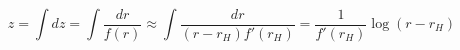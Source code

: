 \begin{equation}
z = \int dz = \int \frac{dr}{f(r)} \approx \int \frac{dr}{(r-r_H) f'(r_H)} = \frac{1}{f'(r_H)} \log (r-r_H) 
\end{equation}

